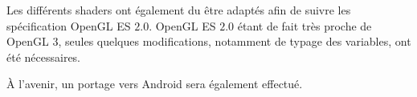 \documentclass[10pt,a4paper,twoside, twocolumn]{report}
\newcommand*{\rootPath}{../}
\begin{document}
Les différents shaders ont également du être adaptés afin de suivre les spécification OpenGL ES $2.0$. OpenGL ES $2.0$ étant de fait très proche de OpenGL $3$, seules quelques modifications, notamment de typage des variables, ont été nécessaires.

À l'avenir, un portage vers Android sera également effectué.

\ifstandalone
	
	
\fi
\end{document}
